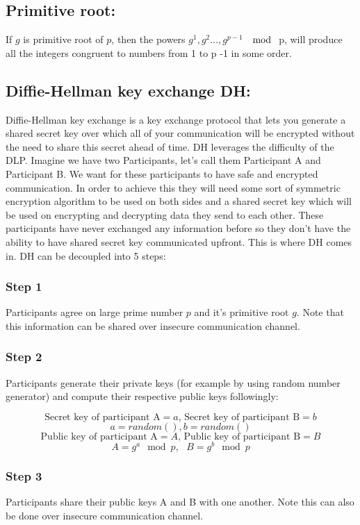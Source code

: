 \documentclass[bp,en]{FEIstyle}
\begin{document}
\subsection*{Primitive root:}
If $g$ is primitive root of $p$, then the powers $g^1,g^2…,g^{p - 1}$ $\mod$ p, will produce all the integers congruent to numbers from 1 to p -1 in some order.


\subsection*{Diffie-Hellman key exchange DH:}

Diffie-Hellman key exchange is a key exchange protocol that lets you generate a shared secret key over which all of your communication will be encrypted without the need to share this secret ahead of time. DH leverages the difficulty of the DLP. Imagine we have two Participants, let's call them Participant A and Participant B. We want for these participants to have safe and encrypted communication. In order to achieve this they will need some sort of symmetric encryption algorithm to be used on both sides and a shared secret key which will be used on encrypting and decrypting data they send to each other. These participants have never exchanged any information before so they don't have the ability to have shared secret key communicated upfront. This is where DH comes in. DH can be decoupled into 5 steps:

\subsubsection*{Step 1}
Participants agree on large prime number $p$ and it's primitive root $g$. Note that this information can be shared over insecure communication channel.

\subsubsection*{Step 2}
Participants generate their private keys (for example by using random number generator) and compute their respective public keys followingly:

\[
\text{Secret key of participant A} = a \text{, Secret key of participant B} = b
\]
\[
a=random(), b=random()
\]
\[
\text{Public key of participant A} = A \text{, Public key of participant B} = B
\]
\[
A= g^a\mod p ,\text{ }B= g^b\mod p
\]

\subsubsection*{Step 3}
Participants share their public keys A and B with one another. Note this can also be done over insecure communication channel.
\end{document}
